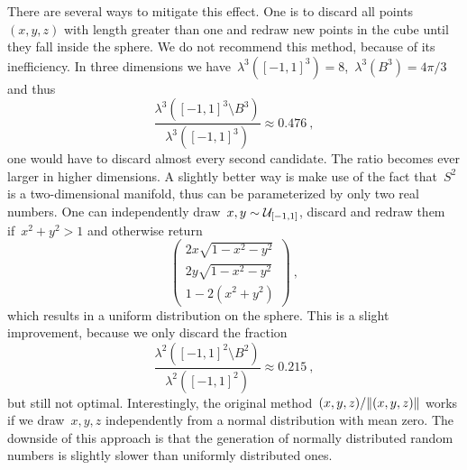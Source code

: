 There are several ways to mitigate this effect. One is to discard all
points~$(x,y,z)$ with length greater than one and redraw new points in the cube
until they fall inside the sphere. We do not recommend this method, because of
its inefficiency. In three dimensions we have~$\lambda^3([-1,1]^3) =
8$,~$\lambda^3(B^3) = 4 \pi / 3$ and thus
%
\begin{equation}
  \frac{\lambda^3([-1,1]^3 \setminus B^3)}{\lambda^3([-1,1]^3)} \approx 0.476\:,
\end{equation}
%
\ie{} one would have to discard almost every second candidate. The ratio becomes
ever larger in higher dimensions. A slightly better way is make use of the fact
that~$S^2$ is a two-dimensional manifold, thus can be parameterized by only two
real numbers. One can independently draw~$x,y \sim \mathcal{U}_{[-1,1]}$, discard and
redraw them if~$x^2 + y^2 > 1$ and otherwise return
%
\begin{equation}
  \begin{pmatrix}
    2 x \sqrt{1 - x^2 - y^2} \\
    2 y \sqrt{1 - x^2 - y^2} \\
    1 - 2 (x^2 + y^2)
  \end{pmatrix} \:,
\end{equation}
%
which results in a uniform distribution on the sphere. This is a slight
improvement, because we only discard the fraction
%
\begin{equation}
  \frac{\lambda^2([-1,1]^2 \setminus B^2)}{\lambda^2([-1,1]^2)} \approx 0.215\:,
\end{equation}
%
but still not optimal. Interestingly, the original
method~$(x,y,z)/\norm{(x,y,z)}$ works if we draw~$x,y,z$ independently from a
normal distribution with mean zero. The downside of this approach is that the
generation of normally distributed random numbers is slightly slower than
uniformly distributed ones.


